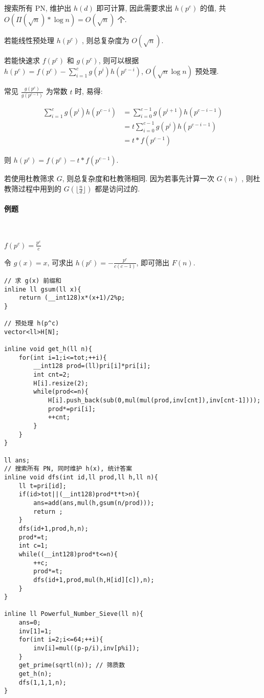 \documentclass{ctexart}
\begin{document}
搜索所有 PN, 维护出 $h(d)$ 即可计算, 因此需要求出 $h(p^c)$ 的值, 共 $O(\Pi(\sqrt{n})*\log{n}) = O(\sqrt{n})$ 个.

若能线性预处理 $h(p^c)$ , 则总复杂度为 $O(\sqrt{n})$.

若能快速求 $f(p^c)$ 和 $g(p^c)$, 则可以根据 $h(p^c)=f(p^c)-\sum_{i=1}^{c} g(p^i)h(p^{c-i})$, $O(\sqrt{n}\log{n})$ 预处理.

\quad 常见 $\frac{g(p^c)}{g(p^{c-1})}$ 为常数 $t$ 时, 易得:

\begin{align*}
    \sum_{i=1}^{c} g(p^{i})h(p^{c-i}) & = \sum_{i=0}^{c-1} g(p^{i+1})h(p^{c-i-1})\\
                              & = t \sum_{i=0}^{c-1} g(p^{i})h(p^{c-i-1})\\
                              & = t * f(p^{c-1})
\end{align*}

\quad 则 $h(p^c)=f(p^c)-t * f(p^{c-1})$.

若使用杜教筛求 $G$, 则总复杂度和杜教筛相同.
因为若事先计算一次 $G(n)$ , 则杜教筛过程中用到的 $G(\lfloor \frac{n}{d} \rfloor)$ 都是访问过的.

\paragraph{例题}\ 

$f(p^c)=\frac{p^c}{c}$

令 $g(x)=x$, 可求出 $h(p^c)=-\frac{p^c}{c(c-1)}$, 即可筛出 $F(n)$.

\begin{lstlisting}
// 求 g(x) 前缀和
inline ll gsum(ll x){
    return (__int128)x*(x+1)/2%p;
}

// 预处理 h(p^c)
vector<ll>H[N];

inline void get_h(ll n){
    for(int i=1;i<=tot;++i){
        __int128 prod=(ll)pri[i]*pri[i];
        int cnt=2;
        H[i].resize(2);
        while(prod<=n){
            H[i].push_back(sub(0,mul(mul(prod,inv[cnt]),inv[cnt-1])));
            prod*=pri[i];
            ++cnt;
        }
    }
}

ll ans;
// 搜索所有 PN, 同时维护 h(x), 统计答案
inline void dfs(int id,ll prod,ll h,ll n){
    ll t=pri[id];
    if(id>tot||(__int128)prod*t*t>n){
        ans=add(ans,mul(h,gsum(n/prod)));
        return ;
    }
    dfs(id+1,prod,h,n);
    prod*=t;
    int c=1;
    while((__int128)prod*t<=n){
        ++c;
        prod*=t;
        dfs(id+1,prod,mul(h,H[id][c]),n);
    }
}

inline ll Powerful_Number_Sieve(ll n){
    ans=0;
    inv[1]=1;
    for(int i=2;i<=64;++i){
        inv[i]=mul((p-p/i),inv[p%i]);
    }
    get_prime(sqrtl(n)); // 筛质数
    get_h(n);
    dfs(1,1,1,n);
}
\end{lstlisting}
\end{document}
